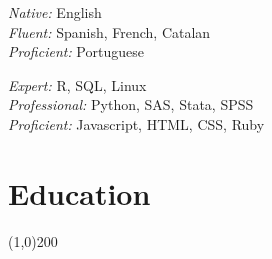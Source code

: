 \documentclass[11pt]{article}
\begin{document}
\begin{multicols}{2}

\noindent \emph{Native:} English\\
\noindent \emph{Fluent:} Spanish, French, Catalan\\
\noindent \emph{Proficient:} Portuguese

\vfill
\columnbreak


\noindent \emph{Expert:} R, SQL, Linux\\
\noindent \emph{Professional:} Python, SAS, Stata, SPSS\\
\noindent \emph{Proficient:} Javascript, HTML, CSS, Ruby


\end{multicols}



\section*{Education} %
\vspace{-7mm}
\line(1,0){200}
\vspace{2mm}
\end{document}
